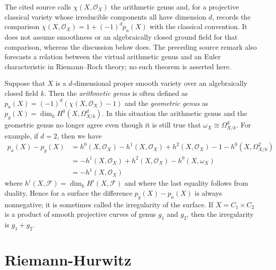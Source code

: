\begin{remark}
\label{remark-genus-higher-dimension}
\begin{reference}
\cite[Chapter III, \S 6, no. 80, Remarks 2 and 3, p. 276]{FAC}
\end{reference}
\begin{history}
The cited source calls $\chi(X, \mathcal{O}_X)$ the arithmetic genus and,
for a projective classical variety whose irreducible components all have
dimension $d$, records the comparison
$\chi(X, \mathcal{O}_X) = 1 + (-1)^d p_a(X)$ with the classical convention.
It does not assume smoothness or an algebraically closed ground field for
that comparison, whereas the discussion below does. The preceding source
remark also forecasts a relation between the virtual arithmetic genus and an
Euler characteristic in Riemann--Roch theory; no such theorem is asserted
here.
\end{history}
Suppose that $X$ is a $d$-dimensional proper smooth variety over
an algebraically closed field $k$.
Then the {\it arithmetic genus} is often defined as
$p_a(X) = (-1)^d(\chi(X, \mathcal{O}_X) - 1)$ and the {\it geometric genus}
as $p_g(X) = \dim_k H^0(X, \Omega^d_{X/k})$. In this situation
the arithmetic genus and the geometric genus no longer agree
even though it is still true that $\omega_X \cong \Omega_{X/k}^d$.
For example, if $d = 2$, then we have
\begin{align*}
p_a(X) - p_g(X) & =
h^0(X, \mathcal{O}_X) - h^1(X, \mathcal{O}_X) + h^2(X, \mathcal{O}_X) - 1
- h^0(X, \Omega^2_{X/k}) \\
& =
- h^1(X, \mathcal{O}_X) + h^2(X, \mathcal{O}_X) - h^0(X, \omega_X) \\
& =
- h^1(X, \mathcal{O}_X)
\end{align*}
where $h^i(X, \mathcal{F}) = \dim_k H^i(X, \mathcal{F})$ and
where the last equality follows from duality.
Hence for a surface the difference $p_g(X) - p_a(X)$ is always
nonnegative; it is sometimes called the irregularity of the surface.
If $X = C_1 \times C_2$ is a product of smooth projective curves of
genus $g_1$ and $g_2$, then the irregularity is $g_1 + g_2$.
\end{remark}






\section{Riemann-Hurwitz}
\label{section-riemann-hurewitz}

